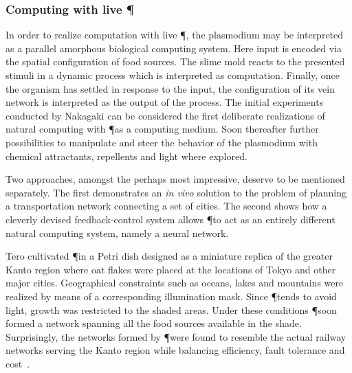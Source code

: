 			\FloatBarrier

		\subsubsection{Computing with live \P}

			In order to realize computation with live \P, the plasmodium may be interpreted as a parallel amorphous biological computing system. Here input is encoded via the spatial configuration of food sources. The slime mold reacts to the presented stimuli in a dynamic process which is interpreted as computation. Finally, once the organism has settled in response to the input, the configuration of its vein network is interpreted as the output of the process. The initial experiments conducted by Nakagaki \etal can be considered the first deliberate realizations of natural computing with \P as a computing medium. Soon thereafter further possibilities to manipulate and steer the behavior of the plasmodium with chemical attractants, repellents and light where explored.  

			Two approaches, amongst the perhaps most impressive, deserve to be mentioned separately. The first demonstrates an \textit{in vivo} solution to the problem of planning a transportation network connecting a set of cities. The second shows how a cleverly devised feedback-control system allows \P to act as an entirely different natural computing system, namely a neural network.

			Tero \etal cultivated \P in a Petri dish designed as a miniature replica of the greater Kanto region where oat flakes were placed at the locations of Tokyo and other major cities. Geographical constraints such as oceans, lakes and mountains were realized by means of a corresponding illumination mask. Since \P tends to avoid light, growth was restricted to the shaded areas. Under these conditions \P soon formed a network spanning all the food sources available in the shade. Surprisingly, the networks formed by \P were found to resemble the actual railway networks serving the Kanto region while balancing efficiency, fault tolerance and cost~\cite{Tero439}. 

